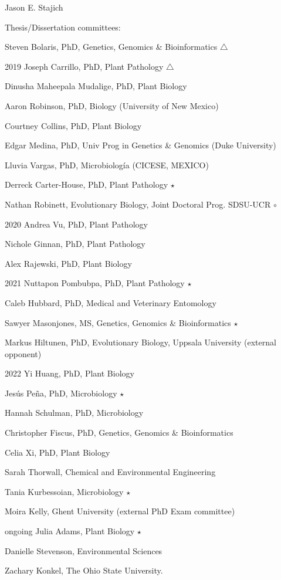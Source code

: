 \documentclass[10pt]{article}
\begin{document}
\begin{cv}{\centerline{Jason E. Stajich}}
\begin{cvlistcompact}{Thesis/Dissertation committees:}
\item Steven Bolaris, PhD, Genetics, Genomics \& Bioinformatics $\triangle$
\item [2019] Joseph Carrillo, PhD, Plant Pathology $\triangle$
\item Dinusha Maheepala Mudalige, PhD, Plant Biology
\item Aaron Robinson, PhD, Biology (University of New Mexico)
\item Courtney Collins, PhD, Plant Biology
\item Edgar Medina, PhD, Univ Prog in Genetics \& Genomics (Duke University)
\item Lluvia Vargas, PhD, Microbiolog\'{i}a (CICESE, MEXICO)
\item Derreck Carter-House, PhD, Plant Pathology $\star$
\item Nathan Robinett, Evolutionary Biology, Joint Doctoral Prog. SDSU-UCR $\circ$
\item [2020] Andrea Vu, PhD, Plant Pathology
\item Nichole Ginnan, PhD, Plant Pathology
\item Alex Rajewski, PhD, Plant Biology
\item[2021] Nuttapon Pombubpa, PhD, Plant Pathology $\star$
\item Caleb Hubbard, PhD, Medical and Veterinary Entomology
\item Sawyer Masonjones, MS, Genetics, Genomics \& Bioinformatics $\star$
\item Markus Hiltunen, PhD, Evolutionary Biology, Uppsala University (external opponent)
\item [2022] Yi Huang, PhD, Plant Biology
\item Jes\'{u}s Pe\~{n}a, PhD, Microbiology $\star$
\item Hannah Schulman, PhD, Microbiology
\item Christopher Fiscus, PhD, Genetics, Genomics \& Bioinformatics
\item Celia Xi, PhD, Plant Biology
\item Sarah Thorwall, Chemical and Environmental Engineering
\item Tania Kurbessoian, Microbiology $\star$
\item Moira Kelly, Ghent University (external PhD Exam committee)
\item [ongoing] Julia Adams, Plant Biology $\star$
\item Danielle Stevenson, Environmental Sciences
\item Zachary Konkel, The Ohio State University.

\end{cvlistcompact}
\end{cv}
\end{document}
